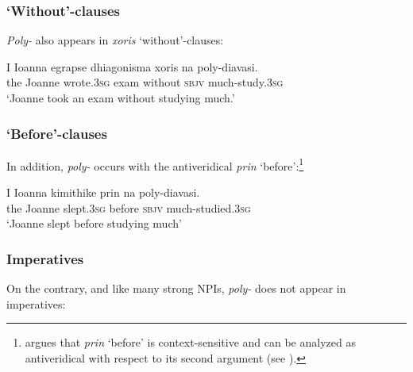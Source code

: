 \documentclass[output=paper]{langscibook}
\begin{document}
\subsubsection{`Without'-clauses}

\noindent \textit{Poly-} also appears in \textit{xoris} `without'-clauses:

\begin{exe}
        \ex\label{gia:ex9} \gll I Ioanna egrapse dhiagonisma xoris na poly-diavasi. \\
        the Joanne wrote.\textsc{3sg} exam without \textsc{sbjv} much-study.\textsc{3sg} \\
        \trans `Joanne took an exam without studying much.'
\end{exe}

\subsubsection{`Before'-clauses}

\noindent In addition, \textit{poly-} occurs with the antiveridical \textit{prin} `before':\footnote{\citet{giannaki1997dissert,giannaki1998} argues that \textit{prin} `before’ is context-sensitive and can be analyzed as antiveridical with respect to its second argument (see \citealt[143]{giannaki1998}).}

\begin{exe}
        \ex\label{gia:ex10} \gll I Ioanna kimithike prin na poly-diavasi. \\
        the Joanne slept.\textsc{3sg} before \textsc{sbjv} much-studied.\textsc{3sg} \\
        \trans `Joanne slept before studying much'
\end{exe}

\subsubsection{Imperatives}

\noindent On the contrary, and like many strong NPIs, \textit{poly-} does not appear in imperatives:

\begin{exe}
        \label{gia:ex11}
\end{exe}
\end{document}
